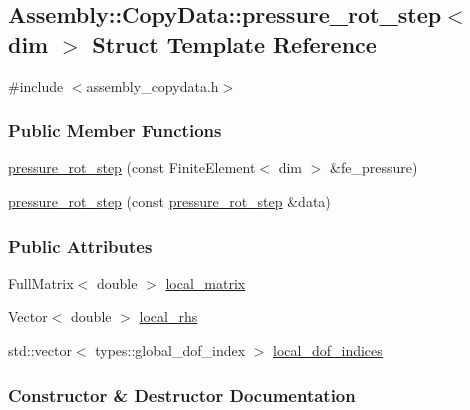 \hypertarget{struct_assembly_1_1_copy_data_1_1pressure__rot__step}{}\subsection{Assembly\+:\+:Copy\+Data\+:\+:pressure\+\_\+rot\+\_\+step$<$ dim $>$ Struct Template Reference}
\label{struct_assembly_1_1_copy_data_1_1pressure__rot__step}


{\ttfamily \#include $<$assembly\+\_\+copydata.\+h$>$}

\subsubsection*{Public Member Functions}
\begin{DoxyCompactItemize}
\item 
\hyperlink{struct_assembly_1_1_copy_data_1_1pressure__rot__step_add5e474ef4a3a50803ac2e722ef7fc7a}{pressure\+\_\+rot\+\_\+step} (const Finite\+Element$<$ dim $>$ \&fe\+\_\+pressure)
\item 
\hyperlink{struct_assembly_1_1_copy_data_1_1pressure__rot__step_ab2fc649ebf1d5b280883f7e4f62cb4e3}{pressure\+\_\+rot\+\_\+step} (const \hyperlink{struct_assembly_1_1_copy_data_1_1pressure__rot__step}{pressure\+\_\+rot\+\_\+step} \&data)
\end{DoxyCompactItemize}
\subsubsection*{Public Attributes}
\begin{DoxyCompactItemize}
\item 
Full\+Matrix$<$ double $>$ \hyperlink{struct_assembly_1_1_copy_data_1_1pressure__rot__step_a316a4598a7bed63334bcb4699469f366}{local\+\_\+matrix}
\item 
Vector$<$ double $>$ \hyperlink{struct_assembly_1_1_copy_data_1_1pressure__rot__step_a43d09c97e5a67574fd254c7539b8d439}{local\+\_\+rhs}
\item 
std\+::vector$<$ types\+::global\+\_\+dof\+\_\+index $>$ \hyperlink{struct_assembly_1_1_copy_data_1_1pressure__rot__step_ade1a65d97b3092835d27a4cd6295482f}{local\+\_\+dof\+\_\+indices}
\end{DoxyCompactItemize}


\subsubsection{Constructor \& Destructor Documentation}
\hypertarget{struct_assembly_1_1_copy_data_1_1pressure__rot__step_add5e474ef4a3a50803ac2e722ef7fc7a}{}
